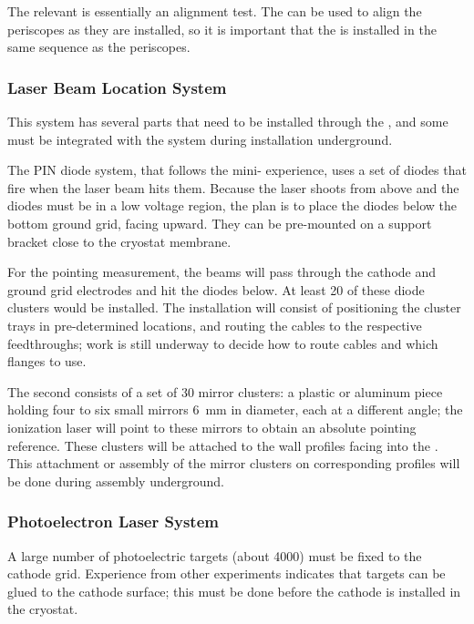 The relevant  is essentially an alignment test.
The  can be used to align the periscopes as they are installed, so it is important that the  is installed in the same sequence as the periscopes.



\subsubsection{Laser Beam Location System}
This system has several parts that need to be installed through the , and some must be integrated with the 
 system during installation underground. 

The PIN diode system, that follows the mini- experience, uses a set of diodes that fire when the laser beam hits them. Because the laser shoots from above and the diodes must be in a low voltage region, the plan is to place the diodes below the bottom ground grid, facing upward. They can be pre-mounted on a support bracket close to the cryostat membrane. 

For the pointing measurement, the beams will pass through the cathode and ground grid electrodes and hit the diodes below. At least \num{20} of these diode clusters would be installed. The installation will consist of positioning the cluster trays in pre-determined locations, and routing the cables to the respective feedthroughs; work is still underway to decide how to route cables and which flanges to use.


The second  consists of a set of \num{30} mirror clusters: a plastic or aluminum piece holding four to six small mirrors \SI{6}{\mm} in diameter, each at a different angle; the ionization laser will point to these mirrors to obtain an absolute pointing reference. These clusters will be attached to the wall  profiles facing into the . 
This attachment or assembly of the mirror clusters on corresponding  profiles will be done during  assembly underground.

\subsubsection{Photoelectron Laser System} 
A large number of photoelectric targets (about \num{4000}) must be fixed to the cathode grid. Experience from other experiments indicates that targets can be glued to the cathode surface; this
must be done before the cathode is installed in the cryostat. 

